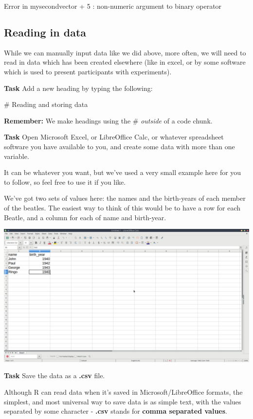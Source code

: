 \documentclass[]{book}
\begin{document}
Error in mysecondvector + 5 : non-numeric argument to binary operator

\hypertarget{reading-in-data}{%
\subsection*{Reading in data}\label{reading-in-data}}

While we can manually input data like we did above, more often, we will need to read in data which has been created elsewhere (like in excel, or by some software which is used to present participants with experiments).

\textbf{Task}
Add a new heading by typing the following:

\# Reading and storing data

\textbf{Remember:} We make headings using the \# \emph{outside} of a code chunk.

\textbf{Task}
Open Microsoft Excel, or LibreOffice Calc, or whatever spreadsheet software you have available to you, and create some data with more than one variable.

It can be whatever you want, but we've used a very small example here for you to follow, so feel free to use it if you like.

We've got two sets of values here: the names and the birth-years of each member of the beatles. The easiest way to think of this would be to have a row for each Beatle, and a column for each of name and birth-year.

\includegraphics{images/installing_intro/create_data.png}

\textbf{Task}
Save the data as a \textbf{.csv} file.

Although R can read data when it's saved in Microsoft/LibreOffice formats, the simplest, and most universal way to save data is as simple text, with the values separated by some character - \textbf{.csv} stands for \textbf{comma separated values}.
\end{document}
